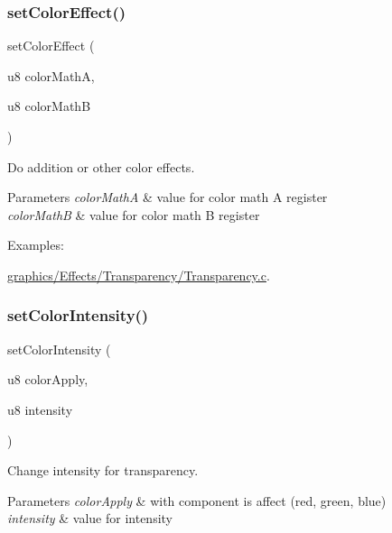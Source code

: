 \subsubsection{\texorpdfstring{set\+Color\+Effect()}{setColorEffect()}}
{\footnotesize\ttfamily set\+Color\+Effect (\begin{DoxyParamCaption}\item[{u8}]{color\+MathA,  }\item[{u8}]{color\+MathB }\end{DoxyParamCaption})}



Do addition or other color effects. 


\begin{DoxyParams}{Parameters}
{\em color\+MathA} & value for color math A register \\
\hline
{\em color\+MathB} & value for color math B register \\
\hline
\end{DoxyParams}
\begin{Desc}
\item[Examples\+: ]\par
\hyperlink{a00408}{graphics/\+Effects/\+Transparency/\+Transparency.\+c}.\end{Desc}
\mbox{\label{a00353_aedc79f1675778d0573d181fe22a0902d}} 
\subsubsection{\texorpdfstring{set\+Color\+Intensity()}{setColorIntensity()}}
{\footnotesize\ttfamily set\+Color\+Intensity (\begin{DoxyParamCaption}\item[{u8}]{color\+Apply,  }\item[{u8}]{intensity }\end{DoxyParamCaption})}



Change intensity for transparency. 


\begin{DoxyParams}{Parameters}
{\em color\+Apply} & with component is affect (red, green, blue) \\
\hline
{\em intensity} & value for intensity \\
\hline
\end{DoxyParams}
\mbox{\label{a00353_ac34bd13a8556c8ac8e1eeeded15f7632}} 
